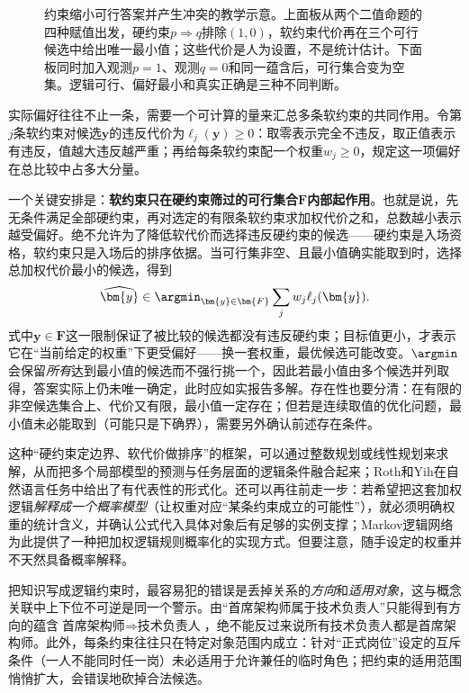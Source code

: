 \begin{figure}[htbp]
  \centering
  
  \caption{约束缩小可行答案并产生冲突的教学示意。上面板从两个二值命题的四种赋值出发，硬约束$p\Rightarrow q$排除$(1,0)$，软约束代价再在三个可行候选中给出唯一最小值；这些代价是人为设置，不是统计估计。下面板同时加入观测$p=1$、观测$q=0$和同一蕴含后，可行集合变为空集。逻辑可行、偏好最小和真实正确是三种不同判断。}
  \label{fig:rule-based-knowledge-acquisition-feasible-set}
\end{figure}

实际偏好往往不止一条，需要一个可计算的量来汇总多条软约束的共同作用。令第$j$条软约束对候选$\bm{y}$的违反代价为$\ell_j(\bm{y})\geq0$：取零表示完全不违反，取正值表示有违反，值越大违反越严重；再给每条软约束配一个权重$w_j\geq0$，规定这一项偏好在总比较中占多大分量。

一个关键安排是：\textbf{软约束只在硬约束筛过的可行集合$\bm{F}$内部起作用}。也就是说，先无条件满足全部硬约束，再对选定的有限条软约束求加权代价之和，总数越小表示越受偏好。绝不允许为了降低软代价而选择违反硬约束的候选——硬约束是入场资格，软约束只是入场后的排序依据。当可行集非空、且最小值确实能取到时，选择总加权代价最小的候选，得到
\begin{equation}
  \widehat{\bm{y}}
  \in
  \argmin_{\bm{y}\in\bm{F}}
  \sum_j w_j\ell_j(\bm{y}).
  \label{eq:rule-based-knowledge-acquisition-soft-constraint}
\end{equation}
式中$\bm{y}\in\bm{F}$这一限制保证了被比较的候选都没有违反硬约束；目标值更小，才表示它在“当前给定的权重”下更受偏好——换一套权重，最优候选可能改变。$\argmin$会保留\emph{所有}达到最小值的候选而不强行挑一个，因此若最小值由多个候选并列取得，答案实际上仍未唯一确定，此时应如实报告多解。存在性也要分清：在有限的非空候选集合上、代价又有限，最小值一定存在；但若是连续取值的优化问题，最小值未必能取到（可能只是下确界），需要另外确认前述存在条件。

这种“硬约束定边界、软代价做排序”的框架，可以通过整数规划或线性规划来求解，从而把多个局部模型的预测与任务层面的逻辑条件融合起来；Roth和Yih在自然语言任务中给出了有代表性的形式化。还可以再往前走一步：若希望把这套加权逻辑\emph{解释成一个概率模型}（让权重对应“某条约束成立的可能性”），就必须明确权重的统计含义，并确认公式代入具体对象后有足够的实例支撑；Markov逻辑网络为此提供了一种把加权逻辑规则概率化的实现方式。但要注意，随手设定的权重并不天然具备概率解释。

把知识写成逻辑约束时，最容易犯的错误是丢掉关系的\emph{方向}和\emph{适用对象}，这与概念关联中上下位不可逆是同一个警示。由“首席架构师属于技术负责人”只能得到有方向的蕴含$\text{首席架构师}\Rightarrow\text{技术负责人}$，绝不能反过来说所有技术负责人都是首席架构师。此外，每条约束往往只在特定对象范围内成立：针对“正式岗位”设定的互斥条件（一人不能同时任一岗）未必适用于允许兼任的临时角色；把约束的适用范围悄悄扩大，会错误地砍掉合法候选。

